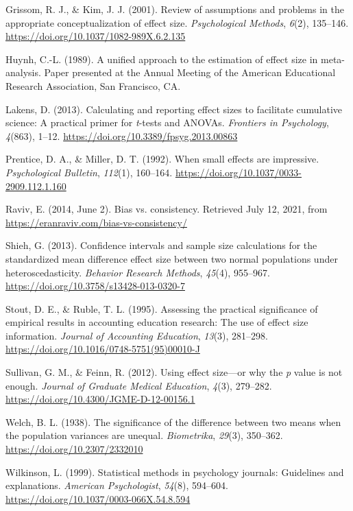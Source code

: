 \documentclass[
  english,
  man,floatsintext]{apa6}
\newlength{\cslhangindent}
\newlength{\cslentryspacingunit} %
\newenvironment{CSLReferences}[2] %
 {%
  \setlength{\parindent}{0pt}
  \ifodd #1
  \let\oldpar\par
  \def\par{\hangindent=\cslhangindent\oldpar}
  \fi
  \setlength{\parskip}{#2\cslentryspacingunit}
 }%
 {}
\begin{document}
\begin{CSLReferences}{1}{0}
\leavevmode{}%
Grissom, R. J., \& Kim, J. J. (2001). Review of assumptions and problems in the appropriate conceptualization of effect size. \emph{Psychological Methods}, \emph{6}(2), 135--146. \url{https://doi.org/10.1037/1082-989X.6.2.135}

\leavevmode{}%
Huynh, C.-L. (1989). A unified approach to the estimation of effect size in meta-analysis. Paper presented at the {A}nnual {M}eeting of the {A}merican {E}ducational {R}esearch {A}ssociation, San Francisco, CA.

\leavevmode{}%
Lakens, D. (2013). Calculating and reporting effect sizes to facilitate cumulative science: A practical primer for \emph{t}-tests and {ANOVAs}. \emph{Frontiers in Psychology}, \emph{4}(863), 1--12. \url{https://doi.org/10.3389/fpsyg.2013.00863}

\leavevmode{}%
Prentice, D. A., \& Miller, D. T. (1992). When small effects are impressive. \emph{Psychological Bulletin}, \emph{112}(1), 160--164. \url{https://doi.org/10.1037/0033-2909.112.1.160}

\leavevmode{}%
Raviv, E. (2014, June 2). Bias vs. consistency. Retrieved July 12, 2021, from \url{https://eranraviv.com/bias-vs-consistency/}

\leavevmode{}%
Shieh, G. (2013). Confidence intervals and sample size calculations for the standardized mean difference effect size between two normal populations under heteroscedasticity. \emph{Behavior Research Methods}, \emph{45}(4), 955--967. \url{https://doi.org/10.3758/s13428-013-0320-7}

\leavevmode{}%
Stout, D. E., \& Ruble, T. L. (1995). Assessing the practical significance of empirical results in accounting education research: The use of effect size information. \emph{Journal of Accounting Education}, \emph{13}(3), 281--298. \url{https://doi.org/10.1016/0748-5751(95)00010-J}

\leavevmode{}%
Sullivan, G. M., \& Feinn, R. (2012). Using effect size---or why the \emph{p} value is not enough. \emph{Journal of Graduate Medical Education}, \emph{4}(3), 279--282. \url{https://doi.org/10.4300/JGME-D-12-00156.1}

\leavevmode{}%
Welch, B. L. (1938). The significance of the difference between two means when the population variances are unequal. \emph{Biometrika}, \emph{29}(3), 350--362. \url{https://doi.org/10.2307/2332010}

\leavevmode{}%
Wilkinson, L. (1999). Statistical methods in psychology journals: Guidelines and explanations. \emph{American Psychologist}, \emph{54}(8), 594--604. \url{https://doi.org/10.1037/0003-066X.54.8.594}

\end{CSLReferences}
\end{document}
